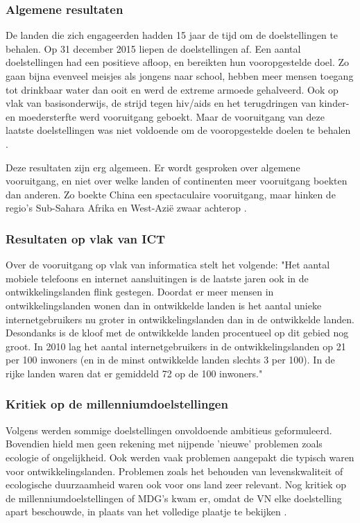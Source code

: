 \subsubsection{Algemene resultaten}
De landen die zich engageerden hadden 15 jaar de tijd om de doelstellingen te behalen. Op 31 december 2015 liepen de doelstellingen af.
Een aantal doelstellingen had een positieve afloop, en bereikten hun vooropgestelde doel. Zo gaan bijna evenveel meisjes als jongens naar school, hebben meer mensen toegang tot drinkbaar water dan ooit en werd de extreme armoede gehalveerd. Ook op vlak van basisonderwijs, de strijd tegen hiv/aids en het terugdringen van kinder- en moedersterfte werd vooruitgang geboekt. Maar de vooruitgang van deze laatste doelstellingen was niet voldoende om de vooropgestelde doelen te behalen \autocite{Tierens2014}.

Deze resultaten zijn erg algemeen. Er wordt gesproken over algemene vooruitgang, en niet over welke landen of continenten meer vooruitgang boekten dan anderen. Zo boekte China een spectaculaire vooruitgang, maar hinken de regio's Sub-Sahara Afrika en West-Azië zwaar achterop \autocite{Tierens2014}.
 
 \subsubsection{Resultaten op vlak van ICT}
Over de vooruitgang op vlak van informatica stelt \autocite{Kampherbeek2012} het volgende: "Het aantal mobiele telefoons en internet aansluitingen is de laatste jaren ook in de ontwikkelingslanden flink gestegen. Doordat er meer mensen in ontwikkelingslanden wonen dan in ontwikkelde landen is het aantal unieke internetgebruikers nu groter in ontwikkelingslanden dan in de ontwikkelde landen. Desondanks is de kloof met de ontwikkelde landen procentueel op dit gebied nog groot. In 2010 lag het aantal internetgebruikers in de ontwikkelingslanden op 21 per 100 inwoners (en in de minst ontwikkelde landen slechts 3 per 100). In de rijke landen waren dat er gemiddeld 72 op de 100 inwoners."
 
 \subsubsection{Kritiek op de millenniumdoelstellingen}
 Volgens \autocite{VN2015} werden sommige doelstellingen onvoldoende ambitieus geformuleerd. Bovendien hield men geen rekening met nijpende 'nieuwe' problemen zoals ecologie of ongelijkheid. Ook werden vaak problemen aangepakt die typisch waren voor ontwikkelingslanden. Problemen zoals het behouden van levenskwaliteit of ecologische duurzaamheid waren ook voor ons land zeer relevant. Nog kritiek op de millenniumdoelstellingen of MDG's kwam er, omdat de VN elke doelstelling apart beschouwde, in plaats van het volledige plaatje te bekijken \autocite{VN2015}.

